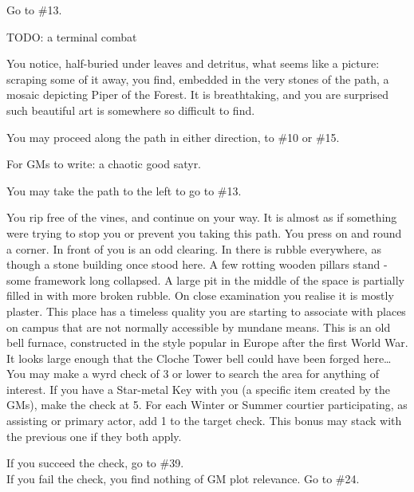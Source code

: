 \documentclass[green]{gl2018}
\begin{document}
\begin{LARGE}
\begin{location}{30}
\begin{fromhere}Go to \#13.\end{fromhere}
\end{location}
\begin{location}{31}
TODO: a terminal combat
\end{location}
\begin{location}{32}
You notice, half-buried under leaves and detritus, what seems like a picture: scraping some of it away, you find, embedded in the very stones of the path, a mosaic depicting Piper of the Forest.  It is breathtaking, and you are surprised such beautiful art is somewhere so difficult to find.
\begin{fromhere}
You may proceed along the path in either direction, to \#10 or \#15.
\end{fromhere}
\end{location}
\begin{location}{33}
For GMs to write: a chaotic good satyr.  
\begin{fromhere}You may take the path to the left to go to \#13.\end{fromhere}
\end{location}
\begin{location}{34}
You rip free of the vines, and continue on your way. It is almost as if something were trying to stop you or prevent you taking this path. You press on and round a corner. In front of you is an odd clearing. In there is rubble everywhere, as though a stone building once stood here. A few rotting wooden pillars stand - some framework long collapsed. A large pit in the middle of the space is partially filled in with more broken rubble. On close examination you realise it is mostly plaster. This place has a timeless quality you are starting to associate with places on campus that are not normally accessible by mundane means. This is an old bell furnace, constructed in the style popular in Europe after the first World War. It looks large enough that the Cloche Tower bell could have been forged here… You may make a wyrd check of 3 or lower to search the area for anything of interest. If you have a Star-metal Key with you (a specific item created by the GMs), make the check at 5. For each Winter or Summer courtier participating, as assisting or primary actor, add 1 to the target check. This bonus may stack with the previous one if they both apply. 
\begin{fromhere}
If you succeed the check, go to \#39.\\
 If you fail the check, you find nothing of GM plot relevance. Go to \#24.

\end{fromhere}
\end{location}
\end{LARGE}
\end{document}
